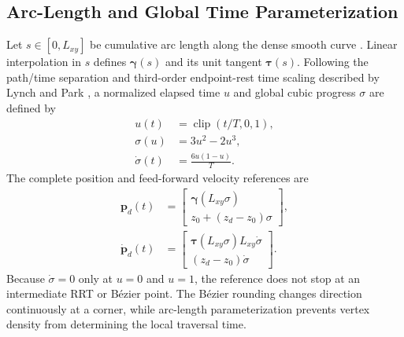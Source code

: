 \documentclass[conference]{IEEEtran}
\begin{document}
\subsection{Arc-Length and Global Time Parameterization}

Let $s\in[0,L_{xy}]$ be cumulative arc length along the dense smooth curve
\cite[Ch.~11]{farin2002}.
Linear interpolation in $s$ defines $\boldsymbol{\gamma}(s)$ and its unit
tangent $\boldsymbol{\tau}(s)$. Following the path/time separation and
third-order endpoint-rest time scaling described by Lynch and Park
\cite[Ch.~9]{lynchpark2017}, a normalized elapsed time $u$ and global cubic
progress $\sigma$ are defined by
\begin{align}
 u(t)&=\operatorname{clip}(t/T,0,1),\\
 \sigma(u)&=3u^2-2u^3,\label{eq:cubic}\\
 \dot{\sigma}(t)&=\frac{6u(1-u)}{T}.
\end{align}
The complete position and feed-forward velocity references are
\begin{align}
 \mathbf{p}_d(t)&=
 \begin{bmatrix}
 \boldsymbol{\gamma}\!\left(L_{xy}\sigma\right)\\
 z_0+(z_d-z_0)\sigma
 \end{bmatrix},\label{eq:positionref}\\
 \dot{\mathbf{p}}_d(t)&=
 \begin{bmatrix}
 \boldsymbol{\tau}\!\left(L_{xy}\sigma\right)L_{xy}\dot{\sigma}\\
 (z_d-z_0)\dot{\sigma}
 \end{bmatrix}.
 \label{eq:velocityref}
\end{align}
Because $\dot{\sigma}=0$ only at $u=0$ and $u=1$, the reference does not stop at
an intermediate RRT or B\'ezier point. The B\'ezier rounding changes direction
continuously at a corner, while arc-length parameterization prevents vertex
density from determining the local traversal time.
\end{document}
